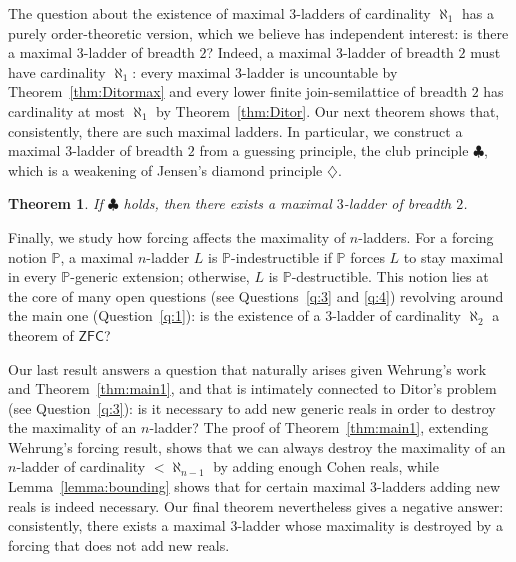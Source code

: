 \documentclass[]{amsart}
\newtheorem{maintheorem}{Theorem}
\theoremstyle{definition}
\theoremstyle{remark}
\begin{document}
The question about the existence of maximal $3$-ladders of cardinality $\aleph_1$ has a purely order-theoretic version, which we believe has independent interest: is there a maximal $3$-ladder of breadth $2$? Indeed, a maximal $3$-ladder of breadth $2$ must have cardinality $\aleph_1$: every maximal $3$-ladder is uncountable by Theorem~\ref{thm:Ditormax} and every lower finite join-semilattice of breadth $2$ has cardinality at most $\aleph_1$ by Theorem~\ref{thm:Ditor}. Our next theorem shows that, consistently, there are such maximal ladders. In particular, we construct a maximal $3$-ladder of breadth $2$ from a guessing principle, the club principle $\clubsuit$, which is a weakening of Jensen's diamond principle $\diamondsuit$.

\begin{maintheorem}\label{thm:main3}
If $\clubsuit$ holds, then there exists a maximal $3$-ladder of breadth $2$.
\end{maintheorem}

Finally, we study how forcing affects the maximality of $n$-ladders. For a forcing notion $\mathbb{P}$, a maximal $n$-ladder $L$ is $\mathbb{P}$-indestructible if $\mathbb{P}$ forces $L$ to stay maximal in every $\mathbb{P}$-generic extension; otherwise, $L$ is $\mathbb{P}$-destructible. This notion lies at the core of many open questions (see Questions~\ref{q:3} and \ref{q:4}) revolving around the main one (Question~\ref{q:1}): is the existence of a $3$-ladder of cardinality $\aleph_2$ a theorem of $\mathsf{ZFC}$? 


Our last result answers a question that naturally arises given Wehrung's work and Theorem~\ref{thm:main1}, and that is intimately connected to Ditor's problem (see Question~\ref{q:3}): is it necessary to add new generic reals in order to destroy the maximality of an $n$-ladder? The proof of Theorem~\ref{thm:main1}, extending Wehrung's forcing result, shows that we can always destroy the maximality of an $n$-ladder of cardinality $< \aleph_{n-1}$ by adding enough Cohen reals, while Lemma~\ref{lemma:bounding} shows that for certain maximal $3$-ladders adding new reals is indeed necessary. Our final theorem nevertheless gives a negative answer: consistently, there exists a maximal $3$-ladder whose maximality is destroyed by a forcing that does not add new reals.
\end{document}
